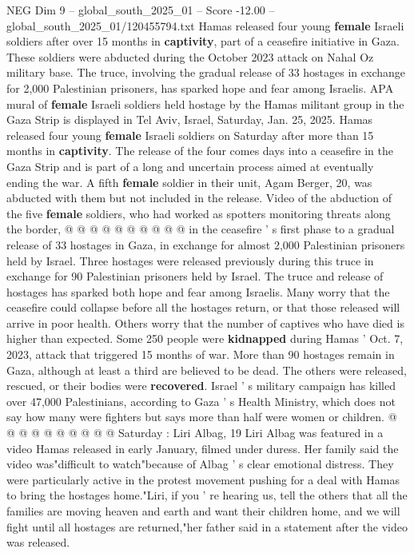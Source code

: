 \begin{textsample}{NEG Dim 9 – global\_south\_2025\_01 – Score -12.00 – global\_south\_2025\_01/120455794.txt}  \label{ex:f9_neg_131}
Hamas released four young \textbf{female} Israeli soldiers after over 15 months in \textbf{captivity}, part of a ceasefire initiative in Gaza.
These soldiers were abducted during the October 2023 attack on Nahal Oz military base.
The truce, involving the gradual release of 33 hostages in exchange for 2,000 Palestinian prisoners, has sparked hope and fear among Israelis.
APA mural of \textbf{female} Israeli soldiers held hostage by the Hamas militant group in the Gaza Strip is displayed in Tel Aviv, Israel, Saturday, Jan. 25, 2025.
Hamas released four young \textbf{female} Israeli soldiers on Saturday after more than 15 months in \textbf{captivity}.
The release of the four comes days into a ceasefire in the Gaza Strip and is part of a long and uncertain process aimed at eventually ending the war.
A fifth \textbf{female} soldier in their unit, Agam Berger, 20, was abducted with them but not included in the release.
Video of the abduction of the five \textbf{female} soldiers, who had worked as spotters monitoring threats along the border, @ @ @ @ @ @ @ @ @ @ in the ceasefire ' s first phase to a gradual release of 33 hostages in Gaza, in exchange for almost 2,000 Palestinian prisoners held by Israel.
Three hostages were released previously during this truce in exchange for 90 Palestinian prisoners held by Israel.
The truce and release of hostages has sparked both hope and fear among Israelis.
Many worry that the ceasefire could collapse before all the hostages return, or that those released will arrive in poor health.
Others worry that the number of captives who have died is higher than expected.
Some 250 people were \textbf{kidnapped} during Hamas ' Oct. 7, 2023, attack that triggered 15 months of war.
More than 90 hostages remain in Gaza, although at least a third are believed to be dead.
The others were released, rescued, or their bodies were \textbf{recovered}.
Israel ' s military campaign has killed over 47,000 Palestinians, according to Gaza ' s Health Ministry, which does not say how many were fighters but says more than half were women or children. @ @ @ @ @ @ @ @ @ @ Saturday : Liri Albag, 19 Liri Albag was featured in a video Hamas released in early January, filmed under duress.
Her family said the video was"difficult to watch"because of Albag ' s clear emotional distress.
They were particularly active in the protest movement pushing for a deal with Hamas to bring the hostages home."Liri, if you ' re hearing us, tell the others that all the families are moving heaven and earth and want their children home, and we will fight until all hostages are returned,"her father said in a statement after the video was released.

\end{textsample}

